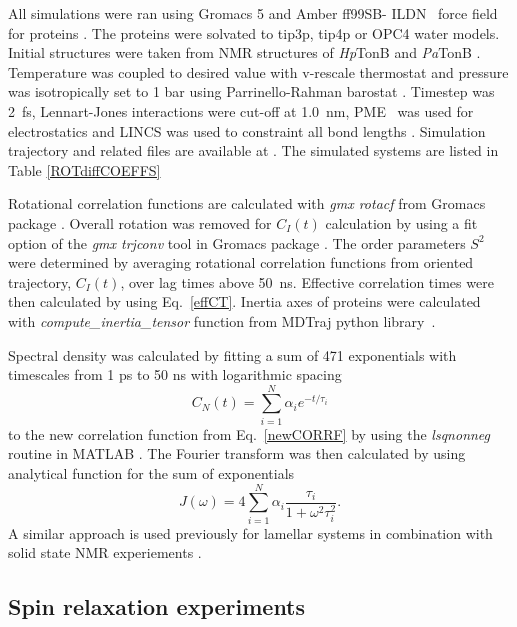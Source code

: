 \documentclass[pre,aps,floatfix,authordate1-4,twocolumn]{revtex4-1}
\begin{document}
All simulations were ran using Gromacs 5 \cite{abraham15}
and Amber ff99SB- ILDN~\cite{lindorff10} force field for proteins . The proteins were solvated
to tip3p\cite{jorgensen83}, tip4p \cite{jorgensen83} or OPC4 \cite{izadi14} water models.
Initial structures were taken from NMR structures of {\it Hp}TonB \cite{ciragan16} and
{\it Pa}TonB \cite{??}.
Temperature was coupled to desired value with v-rescale thermostat \cite{bussi07} and pressure was 
isotropically set to 1 bar using Parrinello-Rahman barostat \cite{parrinello81}.
Timestep was 2~fs, Lennart-Jones interactions were cut-off at 1.0~nm,
PME~\cite{darden93,essman95} was used for electrostatics and LINCS was used
to constraint all bond lengths \cite{hess07}. Simulation trajectory and related
files are available at \cite{??}. The simulated systems are listed
in Table \ref{ROTdiffCOEFFS}


Rotational correlation functions are calculated with {\it gmx rotacf} from
Gromacs package \cite{gromacsMANUAL}. Overall rotation was removed
for $C_I(t)$ calculation by using a fit option of the {\it gmx trjconv} tool
in Gromacs package \cite{gromacsMANUAL}. The order parameters $S^2$
were determined by averaging rotational correlation functions from
oriented trajectory, $C_I(t)$, over lag times above 50~ns. Effective correlation times were then
calculated by using Eq.~\ref{effCT}. 
Inertia axes of proteins were calculated with {\it compute\_inertia\_tensor}
function from MDTraj python library~\cite{McGibbon2015MDTraj}.

Spectral density was calculated by fitting a
sum of 471 exponentials with timescales from 1 ps to 50 ns
with logarithmic spacing
\begin{equation}\label{gprime_fit}
C_N(t)=\sum_{i=1}^{N}\alpha_i e^{-t/\tau_i}
\end{equation}
to the new correlation function from Eq.~\ref{newCORRF}
by using the {\it lsqnonneg} routine in MATLAB \cite{matlab}.
The Fourier transform was then calculated by using analytical function
for the sum of exponentials 
\begin{equation}\label{FTanal}
J(\omega) =  4 \sum_{i=1}^{N}\alpha_i\frac{\tau_i}{1+\omega^2\tau_i^2}.
\end{equation}
A similar approach is used previously for lamellar systems in combination
with solid state NMR experiements \cite{nowacka13,ferreira15}.


\subsection{Spin relaxation experiments}
\end{document}
